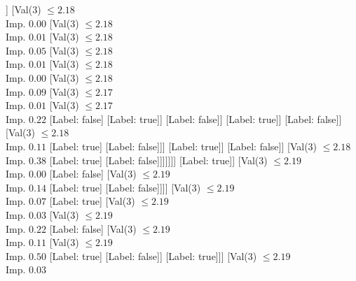 \documentclass[margin=10pt]{standalone}
\begin{document}
\begin{forest}
																									]
																								[Val($3$) $ \leq 2.18$ \\ Imp. $0.00$
																									[Val($3$) $ \leq 2.18$ \\ Imp. $0.01$
																										[Val($3$) $ \leq 2.18$ \\ Imp. $0.05$
																											[Val($3$) $ \leq 2.18$ \\ Imp. $0.01$
																												[Val($3$) $ \leq 2.18$ \\ Imp. $0.00$
																													[Val($3$) $ \leq 2.18$ \\ Imp. $0.09$
																														[Val($3$) $ \leq 2.17$ \\ Imp. $0.01$
																															[Val($3$) $ \leq 2.17$ \\ Imp. $0.22$
																																[Label: false]
																																[Label: true]]
																															[Label: false]]
																														[Label: true]]
																													[Label: false]]
																												[Val($3$) $ \leq 2.18$ \\ Imp. $0.11$
																													[Label: true]
																													[Label: false]]]
																											[Label: true]]
																										[Label: false]]
																									[Val($3$) $ \leq 2.18$ \\ Imp. $0.38$
																										[Label: true]
																										[Label: false]]]]]]]
																				[Label: true]]
																			[Val($3$) $ \leq 2.19$ \\ Imp. $0.00$
																				[Label: false]
																				[Val($3$) $ \leq 2.19$ \\ Imp. $0.14$
																					[Label: true]
																					[Label: false]]]]
																		[Val($3$) $ \leq 2.19$ \\ Imp. $0.07$
																			[Label: true]
																			[Val($3$) $ \leq 2.19$ \\ Imp. $0.03$
																				[Val($3$) $ \leq 2.19$ \\ Imp. $0.22$
																					[Label: false]
																					[Val($3$) $ \leq 2.19$ \\ Imp. $0.11$
																						[Val($3$) $ \leq 2.19$ \\ Imp. $0.50$
																							[Label: true]
																							[Label: false]]
																						[Label: true]]]
																				[Val($3$) $ \leq 2.19$ \\ Imp. $0.03$

\end{forest}
\end{document}
